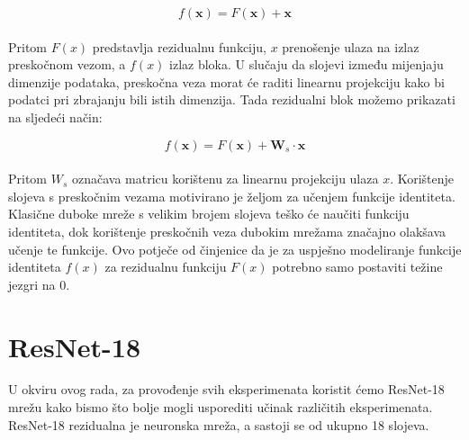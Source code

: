 \documentclass[times, utf8, zavrsni, numeric]{fer}
\begin{document}
\begin{equation}
    f(\pmb{x}) = F(\pmb{x}) + \pmb{x}
    \label{eq:resblock}
\end{equation}
\\
Pritom $F(x)$ predstavlja rezidualnu funkciju, $x$ prenošenje ulaza na izlaz preskočnom vezom, a $f(x)$ izlaz bloka. 
U slučaju da slojevi između mijenjaju dimenzije podataka, preskočna veza morat će raditi linearnu projekciju kako bi podatci pri zbrajanju bili istih dimenzija. 
Tada rezidualni blok možemo prikazati na sljedeći način:

\begin{equation}
    f(\pmb{x}) = F(\pmb{x}) + \pmb{W}_{s} \cdot \pmb{x}
    \label{eq:resblocklp}
\end{equation}
\\
Pritom $W_{s}$ označava matricu korištenu za linearnu projekciju ulaza $x$. 
Korištenje slojeva s preskočnim vezama motivirano je željom za učenjem funkcije identiteta.
Klasične duboke mreže s velikim brojem slojeva teško će naučiti funkciju identiteta, dok korištenje preskočnih veza dubokim mrežama značajno olakšava učenje te funkcije.
Ovo potječe od činjenice da je za uspješno modeliranje funkcije identiteta $f(x)$ za rezidualnu funkciju $F(x)$ potrebno samo postaviti težine jezgri na 0.

\section{ResNet-18}

U okviru ovog rada, za provođenje svih eksperimenata koristit ćemo ResNet-18 mrežu kako bismo što bolje mogli usporediti učinak različitih eksperimenata. 
ResNet-18 rezidualna je neuronska mreža, a sastoji se od ukupno 18 slojeva. 
\end{document}
